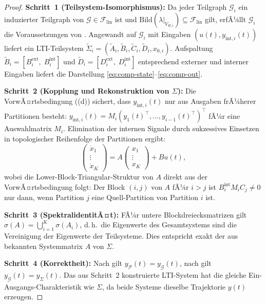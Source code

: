 ﻿\documentclass[12pt,a4paper]{article}
\theoremstyle{definition}
\begin{document}
\begin{proof}
\textbf{Schritt~1 (Teilsystem-Isomorphismus):}
Da jeder Teilgraph $\mathcal{G}_i$ ein induzierter Teilgraph von
$\mathcal{G} \in \mathcal{F}_{\mathrm{lin}}$ ist und
$\mathrm{Bild}(\lambda|_{V_{B,i}}) \subseteq \mathcal{F}_{\mathrm{lin}}$
gilt, erfÃ¼llt $\mathcal{G}_i$ die Voraussetzungen von .
Angewandt auf $\mathcal{G}_i$ mit Eingaben
$(u(t), y_{\mathrm{int},i}(t))$ liefert  ein
LTI-Teilsystem $\tilde{\Sigma}_i = (\tilde{A}_i, \tilde{B}_i,
\tilde{C}_i, \tilde{D}_i, x_{0,i})$.
Aufspaltung
$\tilde{B}_i = [B_i^{\mathrm{ext}},\; B_i^{\mathrm{int}}]$
und
$\tilde{D}_i = [D_i^{\mathrm{ext}},\; D_i^{\mathrm{int}}]$
entsprechend externer und interner Eingaben liefert die Darstellung
\eqref{eq:comp-state}--\eqref{eq:comp-out}.

\textbf{Schritt~2 (Kopplung und Rekonstruktion von $\Sigma$):}
Die VorwÃ¤rtsbedingung ((d)) sichert, dass
$y_{\mathrm{int},i}(t)$ nur aus Ausgaben frÃ¼herer Partitionen
besteht: $y_{\mathrm{int},i}(t) = M_i (y_1(t)^\top, \ldots,
y_{i-1}(t)^\top)^\top$ fÃ¼r eine Auswahlmatrix $M_i$.
Elimination der internen Signale durch sukzessives Einsetzen in
topologischer Reihenfolge der Partitionen ergibt:
\[
  \begin{pmatrix} \dot{x}_1 \\ \vdots \\ \dot{x}_K \end{pmatrix}
  = A
  \begin{pmatrix} x_1 \\ \vdots \\ x_K \end{pmatrix}
  + B u(t),
\]
wobei die Lower-Block-Triangular-Struktur von $A$ direkt aus der
VorwÃ¤rtsbedingung folgt: Der Block $(i,j)$ von $A$ fÃ¼r $i > j$ ist
$B_i^{\mathrm{int}} M_i C_j \neq 0$ nur dann, wenn Partition $j$ eine
Quell-Partition von Partition $i$ ist.

\textbf{Schritt~3 (SpektralidentitÃ¤t):}
FÃ¼r untere Blockdreiecksmatrizen gilt
$\sigma(A) = \bigcup_{i=1}^K \sigma(A_i)$,
d.\,h.\ die Eigenwerte des Gesamtsystems sind die Vereinigung der
Eigenwerte der Teilsysteme. Dies entspricht exakt der aus 
bekannten Systemmatrix $A$ von $\Sigma$.

\textbf{Schritt~4 (Korrektheit):}
Nach  gilt $y_{\mathcal{P}}(t) = y_{\mathcal{G}}(t)$,
nach  gilt $y_{\mathcal{G}}(t) = y_{\Sigma}(t)$.
Das aus Schritt~2 konstruierte LTI-System hat die gleiche Ein-Ausgangs-Charakteristik
wie $\Sigma$, da beide Systeme dieselbe Trajektorie $y(t)$ erzeugen.
\end{proof}
\end{document}
